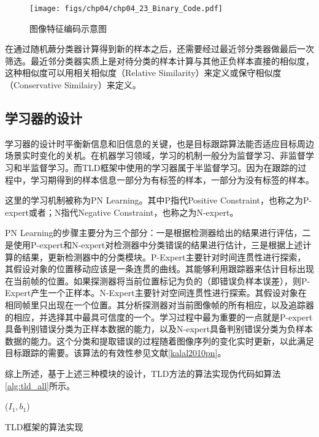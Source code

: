 \begin{figure}[ht]   
	\centering
	\texttt{[image: figs/chp04/chp04\_23\_Binary\_Code.pdf]}
	\caption{图像特征编码示意图}
	\label{fig:chp04_23_Binary_Code}
\end{figure}

在通过随机蕨分类器计算得到新的样本之后，还需要经过最近邻分类器做最后一次筛选。最近邻分类器实质上是对待分类的样本计算与其他正负样本直接的相似度，这种相似度可以用相关相似度（Relative Similarity）来定义或保守相似度（Conservative Similairy）来定义。

\subsection{学习器的设计}
学习器的设计时平衡新信息和旧信息的关键，也是目标跟踪算法能否适应目标周边场景实时变化的关机。在机器学习领域，学习的机制一般分为监督学习、非监督学习和半监督学习。而TLD框架中使用的学习器属于半监督学习。因为在跟踪的过程中，学习期得到的样本信息一部分为有标签的样本，一部分为没有标签的样本。

这里的学习机制被称为PN Learning。其中P指代Positive Constraint，也称之为P-expert或者；N指代Negative Constraint，也称之为N-expert。

PN Learning的步骤主要分为三个部分：一是根据检测器给出的结果进行评估，二是使用P-expert和N-expert对检测器中分类错误的结果进行估计，三是根据上述计算的结果，更新检测器中的分类模块。P-Expert主要针对时间连贯性进行探索，其假设对象的位置移动应该是一条连贯的曲线。其能够利用跟踪器来估计目标出现在当前帧的位置。如果探测器将当前位置标记为负的（即错误负样本误差），则P-Expert产生一个正样本。N-Expert主要针对空间连贯性进行探索。其假设对象在相同帧里只出现在一个位置。其分析探测器对当前图像帧的所有相应，以及追踪器的相应，并选择其中最具可信度的一个。学习过程中最为重要的一点就是P-expert具备判别错误分类为正样本数据的能力，以及N-expert具备判别错误分类为负样本数据的能力。这个分类和提取错误的过程随着图像序列的变化实时更新，以此满足目标跟踪的需要。该算法的有效性参见文献\ref{kalal2010pn}。

综上所述，基于上述三种模块的设计，TLD方法的算法实现伪代码如算法\ref{alg:tld_all}所示。
\begin{algorithm2e}[ht]
	\SetAlgoLined
	\BlankLine
	\LearningInitialization($I_1,b_1$)\;	
	\caption{TLD框架的算法实现}
	\label{alg:tld_all}
\end{algorithm2e}

